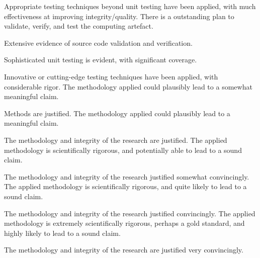 \begin{markingrubric}
            \par Appropriate testing techniques beyond unit testing have been applied, with much effectiveness at improving integrity/quality.
        \grade There is a outstanding plan to validate, verify, and test the computing artefact. 
            \par Extensive evidence of source code validation and verification.
            \par Sophisticated unit testing is evident, with significant coverage.
            \par Innovative or cutting-edge testing techniques have been applied, with considerable rigor.
%
        \grade\fail 
        \grade 		The methodology applied could plausibly lead to a somewhat meaningful claim.
        \par		Methods are justified.
        \grade 		The methodology applied could plausibly lead to a meaningful claim.
        \par		The methodology and integrity of the research are justified.
        \grade 		The applied methodology is scientifically rigorous, and potentially able to lead to a sound claim.
        \par		The methodology and integrity of the research justified somewhat convincingly.
        \grade 		The applied methodology is scientifically rigorous, and quite likely to lead to a sound claim.
        \par		The methodology and integrity of the research justified convincingly.
        \grade 		The applied methodology is extremely scientifically rigorous, perhaps a gold standard, and highly likely to lead to a sound claim.
        \par		The methodology and integrity of the research are justified very convincingly.
%
\end{markingrubric}

